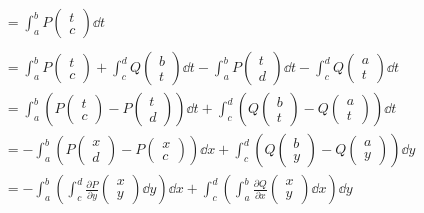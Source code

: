 \begin{satz*}[note = Satz von Green , index = Satz von Green , indexformat = {3!12~ 1!~23}]
\begin{bew}[note = für $B$ Rechteck]
\begin{gather*}
\begin{split}
				&= \int_a^b P\begin{pmatrix} t \\ c \end{pmatrix} \dd t
			\end{split} \\
			\begin{split}
				&= \int_a^b P\begin{pmatrix} t \\ c \end{pmatrix} + \int_c^d Q\begin{pmatrix} b \\ t \end{pmatrix} \dd t - \int_a^b P\begin{pmatrix} t \\ d \end{pmatrix} \dd t - \int_c^d Q\begin{pmatrix} a \\ t \end{pmatrix} \dd t \\
				&= \int_a^b \left( P\begin{pmatrix} t \\ c \end{pmatrix} - P\begin{pmatrix} t \\ d \end{pmatrix} \right) \dd t + \int_c^d \left( Q\begin{pmatrix} b \\ t \end{pmatrix} - Q\begin{pmatrix} a \\ t \end{pmatrix} \right) \dd t \\
				&= - \int_a^b \left( P\begin{pmatrix} x \\ d \end{pmatrix} - P\begin{pmatrix} x \\ c \end{pmatrix} \right) \dd x + \int_c^d \left( Q\begin{pmatrix} b \\ y \end{pmatrix} - Q\begin{pmatrix} a \\ y \end{pmatrix} \right) \dd y \\
				&= -\int_a^b \left( \int_c^d \frac{\partial P}{\partial y}\begin{pmatrix} x \\ y \end{pmatrix} \dd y \right) \dd x + \int_c^d \left( \int_a^b \frac{\partial Q}{\partial x}\begin{pmatrix} x \\ y \end{pmatrix} \dd x \right) \dd y \\

\end{split}
\end{gather*}
\end{bew}
\end{satz*}
